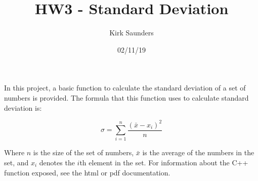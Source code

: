 \documentclass[12pt]{article}
\title{HW3 - Standard Deviation}
\author{Kirk Saunders}
\date{02/11/19}
\begin{document}
\maketitle

In this project, a basic function to calculate the standard deviation of a set of numbers is provided. The formula that this function uses to calculate standard deviation is:

$$\sigma = \sum\limits_{i=1}^n \frac{(\bar{x}-x_i)^2}{n}$$

Where $n$ is the size of the set of numbers, $\bar{x}$ is the average of the numbers in the set, and $x_i$ denotes the $i$th element in the set. For information about the C++ function exposed, see the html or pdf documentation.
\end{document}
